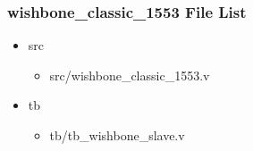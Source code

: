 \subsubsection{wishbone\_classic\_1553 File List}
\begin{itemize}
\item src
	\begin{itemize}
	\item src/wishbone\_classic\_1553.v
	\end{itemize}
\item tb
	\begin{itemize}
	\item tb/tb\_wishbone\_slave.v
	\end{itemize}
\end{itemize}
